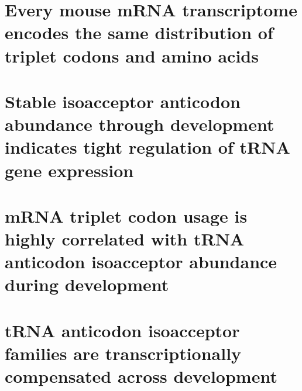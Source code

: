 \section{Every mouse mRNA transcriptome encodes the same distribution of
triplet codons and amino acids}

\section{Stable isoacceptor anticodon abundance through development indicates
tight regulation of tRNA gene expression}

\section{mRNA triplet codon usage is highly correlated with tRNA anticodon
isoacceptor abundance during development}

\section{tRNA anticodon isoacceptor families are transcriptionally compensated
across development}
